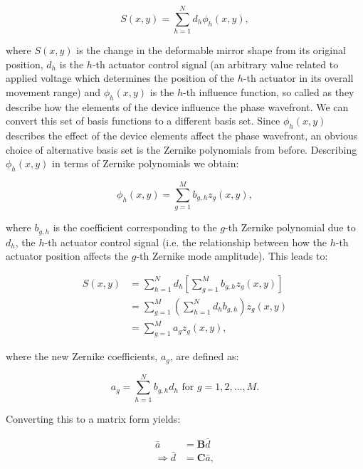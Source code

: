 \begin{equation}\label{eq:surface_shape}
S(x,y) = \sum_{h=1}^{N} d_{h}\phi_{h}(x,y),
\end{equation}

where $S(x,y)$ is the change in the deformable mirror shape from its
original position, $d_h$ is the $h$-th actuator control signal
(an arbitrary value related to applied voltage which
determines the position of the $h$-th actuator in its overall
movement range) and $\phi_{h}(x,y)$ is the $h$-th influence
function, so called as they describe how the elements 
of the device influence the phase wavefront. We can convert
this set of basis functions to a different basis set. Since 
$\phi_{h}(x,y)$ describes the effect of the device elements affect
the phase wavefront, an obvious choice of alternative basis set is
the Zernike polynomials from before. Describing $\phi_{h}(x,y)$ in 
terms of Zernike polynomials we obtain:

\begin{equation}\label{eq:influence_to_zernike}
\phi_{h}(x,y) = \sum_{g=1}^{M} b_{g,h}z_{g}(x,y),
\end{equation}

where $b_{g,h}$ is the coefficient corresponding to the $g$-th
Zernike polynomial due to $d_h$, the $h$-th actuator control
signal (i.e. the relationship between how the $h$-th actuator 
position affects the $g$-th Zernike mode amplitude). This leads to:

\begin{equation}\label{eq:zernike_sub}
\begin{split}
S(x,y) & = \sum_{h=1}^{N} d_{h}\left[\sum_{g=1}^{M} b_{g,h}z_{g}(x,y)\right] \\
& =\sum_{g=1}^{M} \left(\sum_{h=1}^{N} d_{h} b_{g,h}\right) z_{g}(x,y) \\
& =\sum_{g=1}^{M} a_{g} z_{g}(x,y),
\end{split}
\end{equation}

where the new Zernike coefficients, $a_{g}$, are defined as:

\begin{equation}\label{eq:new_z_coef}
a_{g} = \sum_{h=1}^{N} b_{g,h} d_{h} \text{~for~} g=1,2,...,M.
\end{equation}

Converting this to a matrix form yields:

\begin{equation}\label{eq:CM_derivation}
\begin{split}
\bar{a} &= \boldsymbol{B} \bar{d}\\
\Rightarrow \bar{d} &= \boldsymbol{C} \bar{a},
\end{split}
\end{equation}

